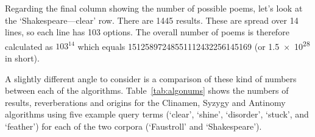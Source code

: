 Regarding the final column showing the number of possible poems, let's look at the `Shakespeare---clear' row. There are 1445 results. These are spread over 14 lines, so each line has 103 options. The overall number of poems is therefore calculated as $103^{14}$ which equals \num{15125897248551112432256145169} (or \num{1.5e28} in short).

\spirals

A slightly different angle to consider is a comparison of these kind of numbers between each of the algorithms. Table~\ref{tab:algonums} shows the numbers of results, reverberations and origins for the Clinamen, Syzygy and Antinomy algorithms using five example query terms (`clear', `shine', `disorder', `stuck', and `feather') for each of the two corpora (`Faustroll' and `Shakespeare').

